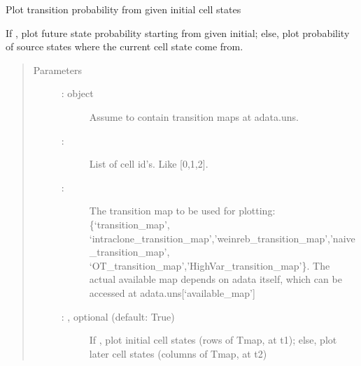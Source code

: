 \documentclass[letterpaper,10pt,english]{sphinxmanual}
\begin{document}
\begin{fulllineitems}
\label{\detokenize{cospar.pl.single_cell_transition:cospar.pl.single_cell_transition}}
Plot transition probability from given initial cell states

If , plot future state probability starting from given initial;
else, plot probability of source states where the current cell state come from.
\begin{quote}\begin{description}
\item[{Parameters}] \leavevmode\begin{description}
\item[{ :  object}] \leavevmode
Assume to contain transition maps at adata.uns.

\item[{ : }] \leavevmode
List of cell id’s. Like {[}0,1,2{]}.

\item[{ : }] \leavevmode
The transition map to be used for plotting: \{‘transition\_map’,
‘intraclone\_transition\_map’,’weinreb\_transition\_map’,’naive\_transition\_map’,
‘OT\_transition\_map’,’HighVar\_transition\_map’\}. The actual available
map depends on adata itself, which can be accessed at adata.uns{[}‘available\_map’{]}

\item[{ : , optional (default: True)}] \leavevmode
If , plot initial cell states (rows of Tmap, at t1);
else, plot later cell states (columns of Tmap, at t2)


\end{description}
\end{description}
\end{quote}
\end{fulllineitems}
\end{document}

